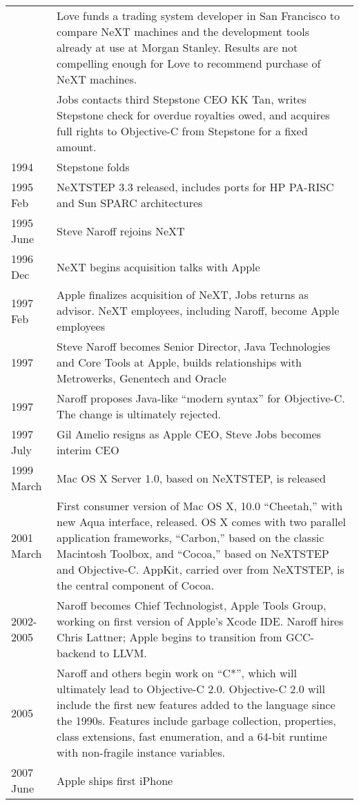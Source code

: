 \documentclass[acmsmall]{acmart}\settopmatter{}
\begin{document}
\begin{longtable}{lp{4.40in}}
	& Love funds a trading system developer in San Francisco to compare NeXT machines and the development tools already at use at Morgan Stanley. Results are not compelling enough for Love to recommend purchase of NeXT machines. \\
	& Jobs contacts third Stepstone CEO KK Tan, writes Stepstone check for overdue royalties owed, and acquires full rights to Objective-C from Stepstone for a fixed amount. \\
1994 	& Stepstone folds \\
1995 Feb	& NeXTSTEP 3.3 released, includes ports for HP PA-RISC and Sun SPARC architectures \\
1995 June	& Steve Naroff rejoins NeXT \\
1996 Dec	& NeXT begins acquisition talks with Apple \\
1997 Feb	& Apple finalizes acquisition of NeXT, Jobs returns as advisor. NeXT employees, including Naroff, become Apple employees \\
1997	& Steve Naroff becomes Senior Director, Java Technologies and Core Tools at Apple, builds relationships with Metrowerks, Genentech and Oracle \\
1997	& Naroff proposes Java-like ``modern syntax'' for Objective-C. The change is ultimately rejected. \\
1997 July	& Gil Amelio resigns as Apple CEO, Steve Jobs becomes interim CEO \\
1999 March 	& Mac OS X Server 1.0, based on NeXTSTEP, is released \\
2001 March	& First consumer version of Mac OS X, 10.0 ``Cheetah,'' with new Aqua interface, released. OS X comes with two parallel application frameworks, ``Carbon,'' based on the classic Macintosh Toolbox, and ``Cocoa,'' based on NeXTSTEP and Objective-C. AppKit, carried over from NeXTSTEP, is the central component of Cocoa. \\
2002-2005	& Naroff becomes Chief Technologist, Apple Tools Group, working on first version of Apple's Xcode IDE. Naroff hires Chris Lattner; Apple begins to transition from GCC-backend to LLVM. \\
2005	& Naroff and others begin work on ``C*'', which will ultimately lead to Objective-C 2.0. Objective-C 2.0 will include the first new features added to the language since the 1990s. Features include garbage collection, properties, class extensions, fast enumeration, and a 64-bit runtime with non-fragile instance variables. \\
2007 June	& Apple ships first iPhone \\

\end{longtable}
\end{document}
